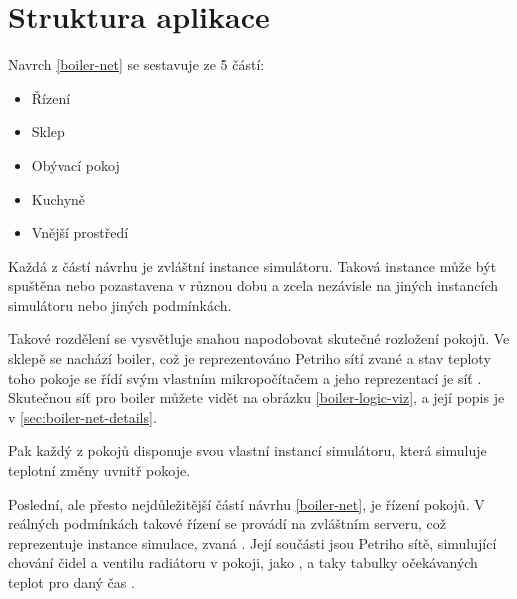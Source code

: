 \section{Struktura aplikace}

Navrch \ref{boiler-net} se sestavuje ze 5 částí:
\begin{itemize}
 \item Řízení
 \item Sklep
 \item Obývací pokoj
 \item Kuchyně
 \item Vnější prostředí
\end{itemize}
Každá z částí návrhu je zvláštní instance simulátoru. Taková instance může být spuštěna nebo pozastavena v různou dobu a zcela nezávisle na jiných instancích simulátoru nebo jiných podmínkách.

Takové rozdělení se vysvětluje snahou napodobovat skutečné rozložení pokojů. Ve sklepě se nachází boiler, což je reprezentováno Petriho sítí zvané  a stav teploty toho pokoje se řídí svým vlastním mikropočítačem a jeho reprezentací je síť . Skutečnou síť pro boiler můžete vidět na obrázku \ref{boiler-logic-viz}, a její popis je v \ref{sec:boiler-net-details}.

Pak každý z pokojů disponuje svou vlastní instancí simulátoru, která simuluje teplotní změny uvnitř pokoje.

Poslední, ale přesto nejdůležitější částí návrhu \ref{boiler-net}, je řízení pokojů. V reálných podmínkách takové řízení se provádí na zvláštním serveru, což reprezentuje instance simulace, zvaná . Její součásti jsou Petriho sítě, simulující chování čidel a ventilu radiátoru v pokoji, jako , a taky tabulky očekávaných teplot pro daný čas .

